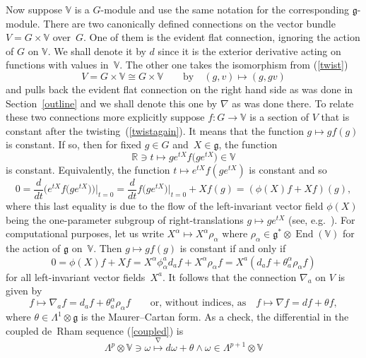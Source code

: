 \documentclass[pdftex]{sigma}
\newcommand{\End}{\operatorname{End}}
\begin{document}
Now suppose ${\mathbb{V}}$ is a $G$-module and use the same notation for the
corresponding ${\mathfrak{g}}$-module. There are two canonically def\/ined
connections on the vector bundle $V=G\times{\mathbb{V}}$ over~$G$. One of them
is the evident f\/lat connection, ignoring the action of $G$ on ${\mathbb{V}}$.
We shall denote it by $d$ since it is the exterior derivative acting on
functions with values in~${\mathbb{V}}$. The other one takes the isomorphism
from (\ref{twist})
\begin{equation}\label{twistagain}
V=G\times{\mathbb{V}}\cong G\times{\mathbb{V}}\qquad\mbox{by}\quad
(g,v)\mapsto(g,gv)\end{equation}
and pulls back the evident f\/lat connection on the right hand side as was done
in Section~\ref{outline} and we shall denote this one by $\nabla$ as was done there.
To relate these two connections more explicitly suppose $f:G\to{\mathbb{V}}$ is
a section of $V$ that is constant after the twisting~(\ref{twistagain}). It
means that the function $g\mapsto gf(g)$ is constant. If so, then for f\/ixed
$g\in G$ and~$X\in{\mathfrak{g}}$, the function
\[{\mathbb{R}}\ni t\mapsto ge^{tX}f\big(ge^{tX}\big)\in{\mathbb{V}}\]
is constant. Equivalently, the function $t\mapsto e^{tX}f(ge^{tX})$ is
constant and so
\[0=\frac{d}{dt}\big(e^{tX}f\big(ge^{tX}\big)\big)\Big|_{t=0}
=\frac{d}{dt}f\big(ge^{tX}\big)\big|_{t=0}+Xf(g)=(\phi(X)f+Xf)(g),\]
where this last equality is due to the f\/low of the left-invariant vector f\/ield
$\phi(X)$ being the one-parameter subgroup of right-translations
$g\mapsto ge^{tX}$ (see, e.g.~\cite{w}). For computational purposes, let us
write $X^\alpha\mapsto X^\alpha\rho_\alpha$ where
$\rho_\alpha\in{\mathfrak{g}}^*\otimes\End({\mathbb{V}})$ for the action of
${\mathfrak{g}}$ on~${\mathbb{V}}$. Then $g\mapsto gf(g)$ is constant if and
only if
\[0=\phi(X)f+Xf=X^\alpha\phi_\alpha^ad_af+X^\alpha\rho_\alpha f
=X^a(d_af+\theta_a^\alpha\rho_\alpha f)\]
for all left-invariant vector f\/ields~$X^a$. It follows that the connection
$\nabla_a$ on $V$ is given by
\begin{equation}\label{nabla}
f\mapsto\nabla_af=d_af+\theta_a^\alpha\rho_\alpha f\qquad
\mbox{or, without indices, as}\quad
f\mapsto\nabla f=df+\theta f,\end{equation}
where $\theta\in\Lambda^1\otimes{\mathfrak{g}}$ is the Maurer--Cartan form. As a
check, the dif\/ferential in the coupled de~Rham sequence (\ref{coupled}) is
\[\Lambda^p\otimes{\mathbb{V}}\ni\omega\stackrel{\nabla}{\longmapsto}
d\omega+\theta\wedge\omega
\in\Lambda^{p+1}\otimes{\mathbb{V}}\]
\end{document}
